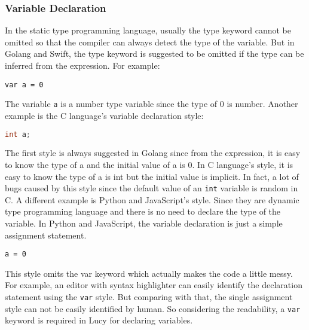 \subsubsection{Variable Declaration}
In the static type programming language, usually the type keyword cannot be omitted so that the compiler can always detect the type of the variable. But in Golang and Swift, the type keyword is suggested to be omitted if the type can be inferred from the expression. For example:
\begin{lstlisting}
var a = 0
\end{lstlisting}
The variable \texttt{a} is a number type variable since the type of 0 is number. Another example is the C language's variable declaration style:
\begin{lstlisting}[language=c]
int a;
\end{lstlisting}
The first style is always suggested in Golang since from the expression, it is easy to know the type of a and the initial value of a is 0. In C language's style, it is easy to know the type of a is int but the initial value is implicit. In fact, a lot of bugs caused by this style since the default value of an \texttt{int} variable is random in C.
A different example is Python and JavaScript's style. Since they are dynamic type programming language and there is no need to declare the type of the variable. In Python and JavaScript, the variable declaration is just a simple assignment statement.
\begin{lstlisting}
a = 0
\end{lstlisting}
This style omits the var keyword which actually makes the code a little messy. For example, an editor with syntax highlighter can easily identify the declaration statement using the \texttt{var} style. But comparing with that, the single assignment style can not be easily identified by human. So considering the readability, a \texttt{var} keyword is required in Lucy for declaring variables.

